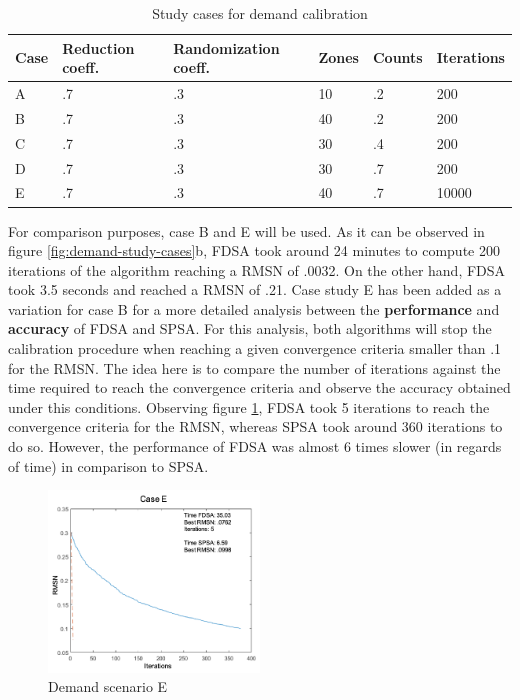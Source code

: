 \begin{table}[htpb]
  \centering
  \begin{tabular}{l l l l l l}
    \toprule
      Case & Reduction coeff. & Randomization coeff. & Zones & Counts & Iterations \\
    \midrule
      A & .7 & .3 & 10 & .2 & 200  \\
      B & .7 & .3 & 40 & .2 & 200  \\
      C & .7 & .3 & 30 & .4 & 200  \\
      D & .7 & .3 & 30 & .7 & 200  \\
      E & .7 & .3 & 40 & .7 & 10000  \\
    \bottomrule
  \end{tabular}
  \caption[Calibration Study Cases]{Study cases for demand calibration}
  \label{tab:demand-scenarions}
\end{table}

For comparison purposes, case B and E will be used. As it can be observed in figure \ref{fig:demand-study-cases}b, FDSA took around 24 minutes to compute 200 iterations of the algorithm reaching a RMSN of .0032. On the other hand, FDSA took 3.5 seconds and reached a RMSN of .21. Case study E has been added as a variation for case B for a more detailed analysis between the \textbf{performance} and \textbf{accuracy} of FDSA and SPSA. For this analysis, both algorithms will stop the calibration procedure when reaching a given convergence criteria smaller than .1 for the RMSN. The idea here is to compare the number of iterations against the time required to reach the convergence criteria and observe the accuracy obtained under this conditions. Observing figure \ref{fig:demand-study-case-e}, FDSA took 5 iterations to reach the convergence criteria for the RMSN, whereas SPSA took around 360 iterations to do so. However, the performance of FDSA was almost 6 times slower (in regards of time) in comparison to SPSA.

\begin{figure}[htpb]
  \centering
  \includegraphics[width=0.5\textwidth]{figures/demand-case-e.png}
  \caption{Demand scenario E}
  \label{fig:demand-study-case-e}
\end{figure}

